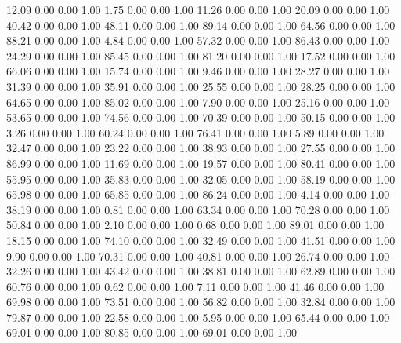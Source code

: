    12.09   0.00   0.00   1.00
    1.75   0.00   0.00   1.00
   11.26   0.00   0.00   1.00
   20.09   0.00   0.00   1.00
   40.42   0.00   0.00   1.00
   48.11   0.00   0.00   1.00
   89.14   0.00   0.00   1.00
   64.56   0.00   0.00   1.00
   88.21   0.00   0.00   1.00
    4.84   0.00   0.00   1.00
   57.32   0.00   0.00   1.00
   86.43   0.00   0.00   1.00
   24.29   0.00   0.00   1.00
   85.45   0.00   0.00   1.00
   81.20   0.00   0.00   1.00
   17.52   0.00   0.00   1.00
   66.06   0.00   0.00   1.00
   15.74   0.00   0.00   1.00
    9.46   0.00   0.00   1.00
   28.27   0.00   0.00   1.00
   31.39   0.00   0.00   1.00
   35.91   0.00   0.00   1.00
   25.55   0.00   0.00   1.00
   28.25   0.00   0.00   1.00
   64.65   0.00   0.00   1.00
   85.02   0.00   0.00   1.00
    7.90   0.00   0.00   1.00
   25.16   0.00   0.00   1.00
   53.65   0.00   0.00   1.00
   74.56   0.00   0.00   1.00
   70.39   0.00   0.00   1.00
   50.15   0.00   0.00   1.00
    3.26   0.00   0.00   1.00
   60.24   0.00   0.00   1.00
   76.41   0.00   0.00   1.00
    5.89   0.00   0.00   1.00
   32.47   0.00   0.00   1.00
   23.22   0.00   0.00   1.00
   38.93   0.00   0.00   1.00
   27.55   0.00   0.00   1.00
   86.99   0.00   0.00   1.00
   11.69   0.00   0.00   1.00
   19.57   0.00   0.00   1.00
   80.41   0.00   0.00   1.00
   55.95   0.00   0.00   1.00
   35.83   0.00   0.00   1.00
   32.05   0.00   0.00   1.00
   58.19   0.00   0.00   1.00
   65.98   0.00   0.00   1.00
   65.85   0.00   0.00   1.00
   86.24   0.00   0.00   1.00
    4.14   0.00   0.00   1.00
   38.19   0.00   0.00   1.00
    0.81   0.00   0.00   1.00
   63.34   0.00   0.00   1.00
   70.28   0.00   0.00   1.00
   50.84   0.00   0.00   1.00
    2.10   0.00   0.00   1.00
    0.68   0.00   0.00   1.00
   89.01   0.00   0.00   1.00
   18.15   0.00   0.00   1.00
   74.10   0.00   0.00   1.00
   32.49   0.00   0.00   1.00
   41.51   0.00   0.00   1.00
    9.90   0.00   0.00   1.00
   70.31   0.00   0.00   1.00
   40.81   0.00   0.00   1.00
   26.74   0.00   0.00   1.00
   32.26   0.00   0.00   1.00
   43.42   0.00   0.00   1.00
   38.81   0.00   0.00   1.00
   62.89   0.00   0.00   1.00
   60.76   0.00   0.00   1.00
    0.62   0.00   0.00   1.00
    7.11   0.00   0.00   1.00
   41.46   0.00   0.00   1.00
   69.98   0.00   0.00   1.00
   73.51   0.00   0.00   1.00
   56.82   0.00   0.00   1.00
   32.84   0.00   0.00   1.00
   79.87   0.00   0.00   1.00
   22.58   0.00   0.00   1.00
    5.95   0.00   0.00   1.00
   65.44   0.00   0.00   1.00
   69.01   0.00   0.00   1.00
   80.85   0.00   0.00   1.00
   69.01   0.00   0.00   1.00

